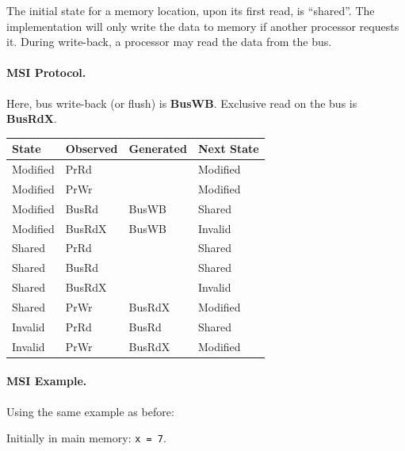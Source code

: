The initial state for a memory location, upon its first read, is ``shared''.
The implementation will only write the data to memory if another
processor requests it.
During write-back, a processor may read the data from the bus.

\paragraph{MSI Protocol.} Here, bus write-back (or flush) is {\bf BusWB}.
Exclusive read on the bus is {\bf BusRdX}.

\begin{center}
    \begin{tabular}{l|l|l|l}
      {\bf State} & {\bf Observed} & {\bf Generated} & {\bf Next State}\\ \hline
      Modified   & PrRd   &        & Modified\\
      Modified   & PrWr   &        & Modified\\
      Modified   & BusRd  & BusWB  & Shared\\
      Modified   & BusRdX & BusWB  & Invalid\\
      Shared     & PrRd   &        & Shared\\
      Shared     & BusRd  &        & Shared\\
      Shared     & BusRdX &        & Invalid\\
      Shared     & PrWr   & BusRdX & Modified\\
      Invalid    & PrRd   & BusRd  & Shared\\
      Invalid    & PrWr   & BusRdX & Modified\\
    \end{tabular}
\end{center}

\paragraph{MSI Example.} Using the same example as before:

Initially in main memory: {\tt x = 7}.

